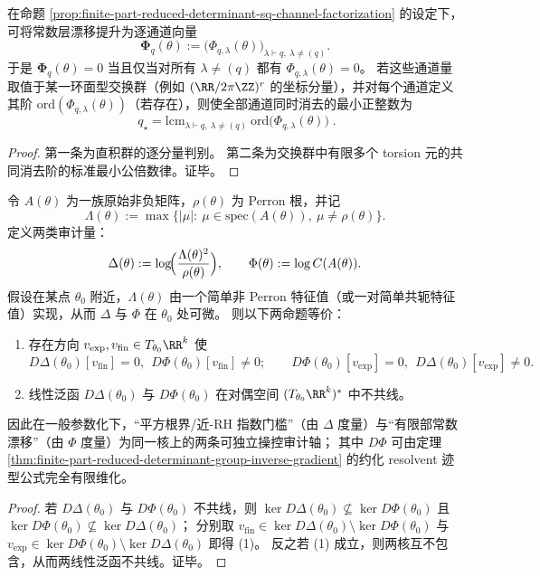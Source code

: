 \begin{corollary}[通道化常数项的逐分量消去与最小消去阶]\label{cor:finite-part-channel-elimination-lcm}
在命题 \ref{prop:finite-part-reduced-determinant-sq-channel-factorization} 的设定下，
可将常数层漂移提升为逐通道向量
\[
\boldsymbol{\Phi}_q(\theta):=\bigl(\Phi_{q,\lambda}(\theta)\bigr)_{\lambda\vdash q,\ \lambda\neq(q)}.
\]
于是 \(\boldsymbol{\Phi}_q(\theta)=0\) 当且仅当对所有 \(\lambda\neq(q)\) 都有 \(\Phi_{q,\lambda}(\theta)=0\)。
若这些通道量取值于某一环面型交换群（例如 \((\RR/2\pi\ZZ)^r\) 的坐标分量），并对每个通道定义其阶 \(\mathrm{ord}(\Phi_{q,\lambda}(\theta))\)（若存在），则使全部通道同时消去的最小正整数为
\[
\boxed{\;
q_\star=\mathrm{lcm}_{\lambda\vdash q,\ \lambda\neq(q)}\ \mathrm{ord}\bigl(\Phi_{q,\lambda}(\theta)\bigr)\; }.
\]
\end{corollary}
\begin{proof}
第一条为直积群的逐分量判别。
第二条为交换群中有限多个 torsion 元的共同消去阶的标准最小公倍数律。证毕。
\end{proof}

\begin{theorem}\label{thm:finite-part-exp-fin-double-threshold-separation}
令 \(A(\theta)\) 为一族原始非负矩阵，\(\rho(\theta)\) 为 Perron 根，并记
\[
\Lambda(\theta):=\max\{|\mu|:\ \mu\in\mathrm{spec}(A(\theta)),\ \mu\neq \rho(\theta)\}.
\]
定义两类审计量：
\[
\Delta(\theta):=\log\!\Bigl(\frac{\Lambda(\theta)^2}{\rho(\theta)}\Bigr),
\qquad
\Phi(\theta):=\log C(A(\theta)).
\]
假设在某点 \(\theta_0\) 附近，\(\Lambda(\theta)\) 由一个简单非 Perron 特征值（或一对简单共轭特征值）实现，从而 \(\Delta\) 与 \(\Phi\) 在 \(\theta_0\) 处可微。
则以下两命题等价：
\begin{enumerate}
  \item 存在方向 \(v_{\mathrm{exp}},v_{\mathrm{fin}}\in T_{\theta_0}\RR^k\) 使
  \[
  D\Delta(\theta_0)[v_{\mathrm{fin}}]=0,\ \ D\Phi(\theta_0)[v_{\mathrm{fin}}]\neq 0;
  \qquad
  D\Phi(\theta_0)[v_{\mathrm{exp}}]=0,\ \ D\Delta(\theta_0)[v_{\mathrm{exp}}]\neq 0.
  \]
  \item 线性泛函 \(D\Delta(\theta_0)\) 与 \(D\Phi(\theta_0)\) 在对偶空间 \((T_{\theta_0}\RR^k)^\ast\) 中不共线。
\end{enumerate}
因此在一般参数化下，“平方根界/近-RH 指数门槛”（由 \(\Delta\) 度量）与“有限部常数漂移”（由 \(\Phi\) 度量）为同一核上的两条可独立操控审计轴；
其中 \(D\Phi\) 可由定理 \ref{thm:finite-part-reduced-determinant-group-inverse-gradient} 的约化 resolvent 迹型公式完全有限维化。
\end{theorem}
\begin{proof}
若 \(D\Delta(\theta_0)\) 与 \(D\Phi(\theta_0)\) 不共线，则 \(\ker D\Delta(\theta_0)\not\subseteq \ker D\Phi(\theta_0)\) 且 \(\ker D\Phi(\theta_0)\not\subseteq \ker D\Delta(\theta_0)\)；
分别取 \(v_{\mathrm{fin}}\in \ker D\Delta(\theta_0)\setminus \ker D\Phi(\theta_0)\) 与 \(v_{\mathrm{exp}}\in \ker D\Phi(\theta_0)\setminus \ker D\Delta(\theta_0)\) 即得 (1)。
反之若 (1) 成立，则两核互不包含，从而两线性泛函不共线。证毕。
\end{proof}

